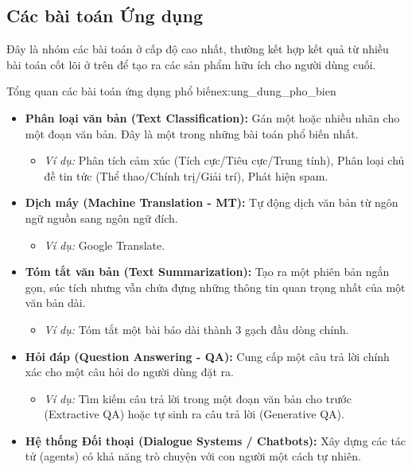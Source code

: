 \subsection{Các bài toán Ứng dụng}
\label{ssec:bai_toan_ung_dung}

Đây là nhóm các bài toán ở cấp độ cao nhất, thường kết hợp kết quả từ nhiều bài toán cốt lõi ở trên để tạo ra các sản phẩm hữu ích cho người dùng cuối.

\begin{example}{Tổng quan các bài toán ứng dụng phổ biến}{ex:ung_dung_pho_bien}
    \begin{itemize}
        \item \textbf{Phân loại văn bản (Text Classification):} Gán một hoặc nhiều nhãn cho một đoạn văn bản. Đây là một trong những bài toán phổ biến nhất.
            \begin{itemize}
                \item \textit{Ví dụ:} Phân tích cảm xúc (Tích cực/Tiêu cực/Trung tính), Phân loại chủ đề tin tức (Thể thao/Chính trị/Giải trí), Phát hiện spam.
            \end{itemize}
        \item \textbf{Dịch máy (Machine Translation - MT):} Tự động dịch văn bản từ ngôn ngữ nguồn sang ngôn ngữ đích.
            \begin{itemize}
                \item \textit{Ví dụ:} Google Translate.
            \end{itemize}
        \item \textbf{Tóm tắt văn bản (Text Summarization):} Tạo ra một phiên bản ngắn gọn, súc tích nhưng vẫn chứa đựng những thông tin quan trọng nhất của một văn bản dài.
            \begin{itemize}
                \item \textit{Ví dụ:} Tóm tắt một bài báo dài thành 3 gạch đầu dòng chính.
            \end{itemize}
        \item \textbf{Hỏi đáp (Question Answering - QA):} Cung cấp một câu trả lời chính xác cho một câu hỏi do người dùng đặt ra.
            \begin{itemize}
                \item \textit{Ví dụ:} Tìm kiếm câu trả lời trong một đoạn văn bản cho trước (Extractive QA) hoặc tự sinh ra câu trả lời (Generative QA).
            \end{itemize}
        \item \textbf{Hệ thống Đối thoại (Dialogue Systems / Chatbots):} Xây dựng các tác tử (agents) có khả năng trò chuyện với con người một cách tự nhiên.

\end{itemize}
\end{example}
